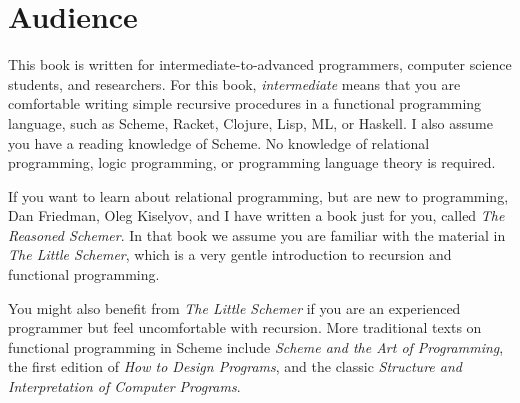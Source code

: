 

\section{Audience}\label{sec:preface:audience}

%
This book is written for
intermediate-to-advanced programmers, computer science students, and
researchers.  For this book, \emph{intermediate} means that you are
comfortable writing simple recursive procedures in a functional
programming language, such as Scheme, Racket, Clojure, Lisp, ML, or
Haskell.  I also assume you have a reading knowledge of Scheme.
%
No knowledge of relational programming, logic programming, or programming
language theory is required.

If you want to learn about relational programming, but are new to
programming, Dan Friedman, Oleg Kiselyov, and I have written a book
just for you, called \emph{The Reasoned Schemer}\cite{trs}. In that
book we assume you are familiar with the material in \emph{The Little
  Schemer}\cite{Friedman:1996:LS:230223}, which is a very gentle
introduction to recursion and functional programming.

You might also benefit from \emph{The Little Schemer} if you are an
experienced programmer but feel uncomfortable with recursion.  More
traditional texts on functional programming in Scheme include
\emph{Scheme and the Art of Programming}\cite{Springer:1989:Art}, the
first edition of \emph{How to Design
  Programs}\cite{Felleisen:2001:htdp1}, and the classic \emph{Structure and
  Interpretation of Computer
  Programs}\cite{Abelson:1996:SIC:547755}.

